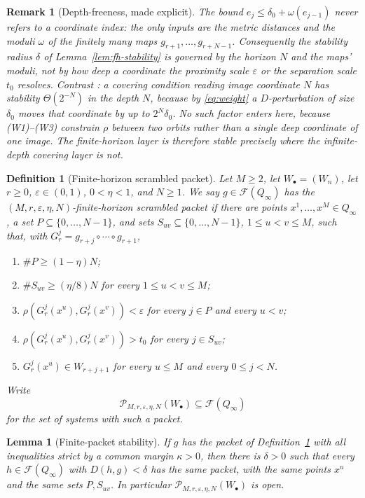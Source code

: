 \documentclass[11pt]{article}
\newtheorem{lemma}[theorem]{Lemma}
\newtheorem{definition}[theorem]{Definition}
\newtheorem{remark}[theorem]{Remark}
\newcommand{\Q}{Q_\infty}
\newcommand{\F}{\mathcal{F}}
\begin{document}
\begin{remark}[Depth-freeness, made explicit]\label{rem:depth-free}
The bound $e_j\le\delta_0+\omega(e_{j-1})$ never refers to a coordinate index: the only
inputs are the metric distances and the moduli $\omega$ of the finitely many maps
$g_{r+1},\dots,g_{r+N-1}$.  Consequently the stability radius $\delta$ of
Lemma~\ref{lem:fh-stability} is governed by the \emph{horizon} $N$ and the maps' moduli,
not by how deep a coordinate the proximity scale $\varepsilon$ or the separation scale
$t_0$ resolves.  Contrast \cite[Remark~3.6]{companion}: a covering condition reading
image coordinate $N$ has stability $\Theta(2^{-N})$ in the \emph{depth} $N$, because by
\eqref{eq:weight} a $D$-perturbation of size $\delta_0$ moves that coordinate by up to
$2^{N}\delta_0$.  No such factor enters here, because (W1)--(W3) constrain $\rho$ between
two orbits rather than a single deep coordinate of one image.  The finite-horizon layer
is therefore stable precisely where the infinite-depth covering layer is not.
\end{remark}

\begin{definition}[Finite-horizon scrambled packet]\label{def:packet}
Let \(M\ge2\), let \(W_\bullet=(W_n)\), let \(r\ge0\),
\(\varepsilon\in(0,1)\), \(0<\eta<1\), and \(N\ge1\).  We say
\(g\in\F(\Q)\) has the
\emph{\((M,r,\varepsilon,\eta,N)\)-finite-horizon scrambled packet} if there
are points \(x^1,\ldots,x^M\in\Q\), a set
\(P\subseteq\{0,\ldots,N-1\}\), and sets
\(S_{uv}\subseteq\{0,\ldots,N-1\}\), \(1\le u<v\le M\), such that, with
\(G^j_r=g_{r+j}\circ\cdots\circ g_{r+1}\),
\begin{enumerate}
\item[(P1)] \(\#P\ge(1-\eta)N\);
\item[(P2)] \(\#S_{uv}\ge(\eta/8)N\) for every \(1\le u<v\le M\);
\item[(P3)] \(\rho(G^j_r(x^u),G^j_r(x^v))<\varepsilon\) for every
  \(j\in P\) and every \(u<v\);
\item[(P4)] \(\rho(G^j_r(x^u),G^j_r(x^v))>t_0\) for every
  \(j\in S_{uv}\);
\item[(P5)] \(G^j_r(x^u)\in W_{r+j+1}\) for every \(u\le M\) and every
  \(0\le j<N\).
\end{enumerate}
Write
\[
  \mathcal P_{M,r,\varepsilon,\eta,N}(W_\bullet)\subseteq\F(\Q)
\]
for the set of systems with such a packet.
\end{definition}

\begin{lemma}[Finite-packet stability]\label{lem:packet-stability}
If \(g\) has the packet of Definition~\ref{def:packet} with all inequalities strict
by a common margin \(\kappa>0\), then there is \(\delta>0\) such that every
\(h\in\F(\Q)\) with \(D(h,g)<\delta\) has the same packet, with the same
points \(x^u\) and the same sets \(P,S_{uv}\).  In particular
\(\mathcal P_{M,r,\varepsilon,\eta,N}(W_\bullet)\) is open.
\end{lemma}
\end{document}
